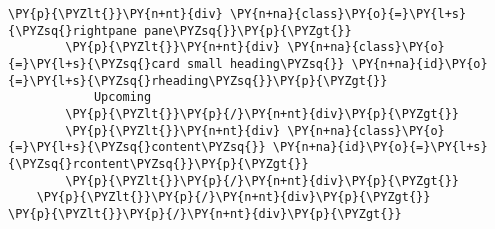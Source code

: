 \begin{Verbatim}[commandchars=\\\{\}]
    \PY{p}{\PYZlt{}}\PY{n+nt}{div} \PY{n+na}{class}\PY{o}{=}\PY{l+s}{\PYZsq{}rightpane pane\PYZsq{}}\PY{p}{\PYZgt{}}
        \PY{p}{\PYZlt{}}\PY{n+nt}{div} \PY{n+na}{class}\PY{o}{=}\PY{l+s}{\PYZsq{}card small heading\PYZsq{}} \PY{n+na}{id}\PY{o}{=}\PY{l+s}{\PYZsq{}rheading\PYZsq{}}\PY{p}{\PYZgt{}}
            Upcoming
        \PY{p}{\PYZlt{}}\PY{p}{/}\PY{n+nt}{div}\PY{p}{\PYZgt{}}
        \PY{p}{\PYZlt{}}\PY{n+nt}{div} \PY{n+na}{class}\PY{o}{=}\PY{l+s}{\PYZsq{}content\PYZsq{}} \PY{n+na}{id}\PY{o}{=}\PY{l+s}{\PYZsq{}rcontent\PYZsq{}}\PY{p}{\PYZgt{}}
        \PY{p}{\PYZlt{}}\PY{p}{/}\PY{n+nt}{div}\PY{p}{\PYZgt{}}
    \PY{p}{\PYZlt{}}\PY{p}{/}\PY{n+nt}{div}\PY{p}{\PYZgt{}}
\PY{p}{\PYZlt{}}\PY{p}{/}\PY{n+nt}{div}\PY{p}{\PYZgt{}}
\end{Verbatim}
